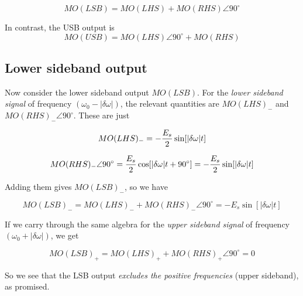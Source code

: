 \documentclass[11pt,preprint]{aastex}
\begin{document}
\begin{mathletters}
\begin{equation}
MO(LSB) = MO(LHS) + MO(RHS) \angle 90^\circ
\end{equation}

\noindent In contrast, the USB output is
\begin{equation}
MO(USB) = MO(LHS)\angle 90^\circ + MO(RHS)
\end{equation}
\end{mathletters}

\subsection{Lower sideband output}

        Now consider the lower sideband output $MO(LSB)$. For the {\it
lower sideband signal} of frequency $(\omega_0 - |\delta \omega|)$, the
relevant quantities are $MO(LHS)_-$ and $MO(RHS)_- \angle 90^\circ$.
These are just

\begin{mathletters}
\begin{equation}
MO(LHS)_- =
-{E_s \over 2} \sin [|\delta \omega | t]
\end{equation}

\begin{equation}
MO(RHS)_- \angle 90^\circ =
{E_s \over 2} \cos [|\delta \omega | t + 90^\circ] =
   -{E_s \over 2} \sin [|\delta \omega | t]
\end{equation}
\end{mathletters}

\noindent Adding them gives $MO(LSB)_-$, so we have


\begin{mathletters}
\begin{equation}
MO(LSB)_- = MO(LHS)_- + MO(RHS)_- \angle 90^\circ =
   -E_s  \sin [|\delta \omega | t]
\end{equation}

\noindent If we carry through the same algebra for the {\it upper
sideband signal} of frequency $(\omega_0 + |\delta \omega|)$, we get

\begin{equation}
MO(LSB)_+ = MO(LHS)_+ + MO(RHS)_+ \angle 90^\circ = 0
\end{equation}
\end{mathletters}

\noindent So we see that the LSB output {\it excludes the positive
frequencies} (upper sideband), as promised.
\end{document}
